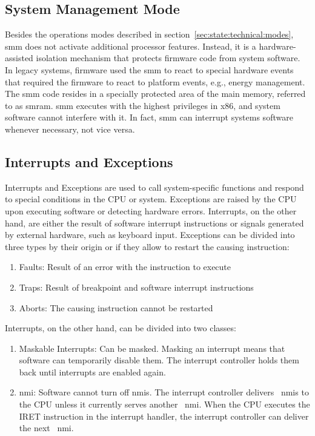 \subsection{System Management Mode}
\label{sec:state:technical:smm}
Besides the operations modes described in
section~\ref{sec:state:technical:modes}, \gls{smm} does not activate additional
processor features. Instead, it is a hardware-assisted isolation
mechanism that protects firmware code from system software. In legacy systems,
firmware used the \gls{smm} to react to special hardware events that required the
firmware to react to platform events, e.g., energy management. The \gls{smm} code
resides in a specially protected area of the main memory, referred to as
\gls{smram}. \gls{smm} executes with the highest privileges in x86, and system
software cannot interfere with it. In fact, \gls{smm} can interrupt
systems software whenever necessary, not vice versa.

\subsection{Interrupts and Exceptions}
\label{sec:state:technical:interrupts}
Interrupts and Exceptions are used to call system-specific functions and respond
to special conditions in the CPU or system. Exceptions are raised by the CPU
upon executing software or detecting hardware errors. Interrupts, on the other
hand, are either the result of software interrupt instructions or signals
generated by external hardware, such as keyboard input. Exceptions can be
divided into three types by their origin or if they allow to restart the causing
instruction:
\begin{enumerate}
  \item Faults: Result of an error with the instruction to execute
  \item Traps: Result of breakpoint and software interrupt instructions
  \item Aborts: The causing instruction cannot be restarted
\end{enumerate}
Interrupts, on the other hand, can be divided into two classes:
\begin{enumerate}
  \item Maskable Interrupts: Can be masked. Masking an interrupt means that
    software can temporarily disable them. The interrupt controller holds
    them back until interrupts are enabled again.
  \item \Gls{nmi}: Software cannot turn off
    \glspl{nmi}. The interrupt controller delivers~
    \glspl{nmi} to the CPU unless it currently serves another~
    \gls{nmi}. When the CPU executes the IRET instruction in the
    interrupt handler, the interrupt controller can deliver the next~
    \gls{nmi}.
\end{enumerate}

